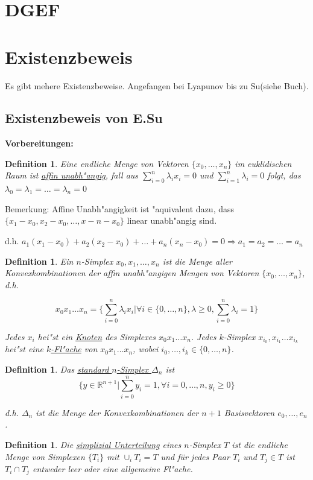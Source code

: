 \documentclass[11pt, a4paper, twoside]{article}
\newtheorem{defi}[satz]{Definition}
\numberwithin{equation}{section}
\begin{document}
\section{DGEF}
\newpage
\section{Existenzbeweis}
Es gibt mehere Existenzbeweise. Angefangen bei Lyapunov bis zu Su(siehe Buch).
\subsection{Existenzbeweis von E.Su}
\textbf{Vorbereitungen:}\\
\begin{defi}
Eine endliche Menge von Vektoren $\{x_0,\ldots,x_n\}$ im euklidischen Raum ist \underline{affin unabh"angig}, fall aus $\sum_{i=0}^n\lambda_ix_i=0$ und $\sum_{i=1}^n\lambda_i=0$ folgt, das $\lambda_0=\lambda_1=\ldots=\lambda_n=0$

\end{defi}

Bemerkung:
Affine Unabh"angigkeit ist "aquivalent dazu, dass $\{x_1-x_0,x_2-x_0,\ldots,x-n-x_0\}$ linear unabh"angig sind.

d.h. $a_1(x_1-x_0)+a_2(x_2-x_0)+\ldots+a_n(x_n-x_0)=0\Rightarrow a_1=a_2=\ldots=a_n$

\begin{defi}
Ein $n$-Simplex $x_0,x_1,\ldots,x_n$ ist die Menge aller Konvexkombinationen der affin unabh"angigen Mengen von Vektoren $\{x_0,\ldots,x_n\}$, d.h.

$$x_0x_1\ldots x_n=
\{
\sum_{i=0}^n\lambda_ix_i | \forall i\in\{0,\ldots,n\},\lambda\geq0, \sum_{i=0}^n\lambda_i=1\}$$

Jedes $x_i$ hei"st ein \underline{Knoten} des Simplexes $x_0x_1\ldots x_n$.
Jedes $k$-Simplex $x_{i_0},x_{i_1}\ldots x_{i_k}$ hei"st eine \underline{$k$-Fl"ache} von $x_0x_1\ldots x_n$, wobei $i_0,\ldots,i_k\in\{0,\ldots,n\}$.
\end{defi}

\begin{defi}
Das \underline{standard $n$-Simplex $\Delta_n$} ist
$$\{y\in\mathbb{R}^{n+1} | \sum_{i=0}^ny_i=1,\forall i=0,\ldots,n, y_i\geq0\}$$

d.h. $\Delta_n$ ist die Menge der Konvexkombinationen der $n+1$ Basisvektoren $e_0,\ldots,e_n$.
\end{defi}

\begin{defi}
Die \underline{simplizial Unterteilung} eines $n$-Simplex $T$ ist die endliche Menge von Simplexen $\{T_i\}$ mit $\cup_iT_i=T$ und für jedes Paar $T_i$ und $T_j\in T$ ist $T_i\cap T_j$ entweder leer oder eine allgemeine Fl"ache.
\end{defi}
\end{document}
